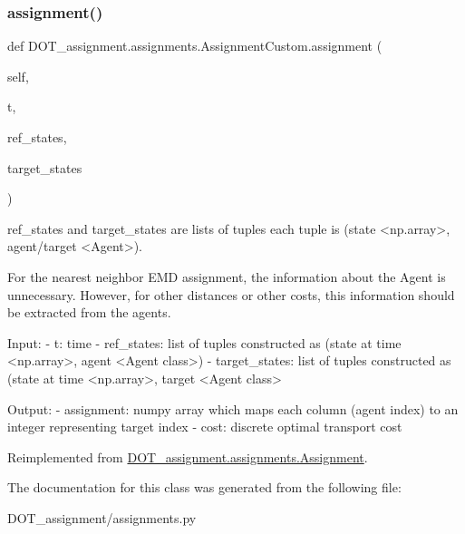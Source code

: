 \subsubsection{\texorpdfstring{assignment()}{assignment()}}
{\footnotesize\ttfamily def D\+O\+T\+\_\+assignment.\+assignments.\+Assignment\+Custom.\+assignment (\begin{DoxyParamCaption}\item[{}]{self,  }\item[{}]{t,  }\item[{}]{ref\+\_\+states,  }\item[{}]{target\+\_\+states }\end{DoxyParamCaption})}

\begin{DoxyVerb}ref_states and target_states are lists of tuples
each tuple is (state <np.array>, agent/target <Agent>).

For the nearest neighbor EMD assignment, the information
about the Agent is unnecessary. However, for other distances
or other costs, this information should be extracted
from the agents.

Input:
- t:                    time
- ref_states:           list of tuples constructed as (state at time <np.array>, agent <Agent class>)
- target_states:        list of tuples constructed as (state at time <np.array>, target <Agent class>

Output:
- assignment:           numpy array which maps each column (agent index) to an integer representing target index
- cost:                 discrete optimal transport cost\end{DoxyVerb}
 

Reimplemented from \mbox{\hyperlink{class_d_o_t__assignment_1_1assignments_1_1_assignment}{D\+O\+T\+\_\+assignment.\+assignments.\+Assignment}}.



The documentation for this class was generated from the following file\+:\begin{DoxyCompactItemize}
\item 
D\+O\+T\+\_\+assignment/assignments.\+py\end{DoxyCompactItemize}
